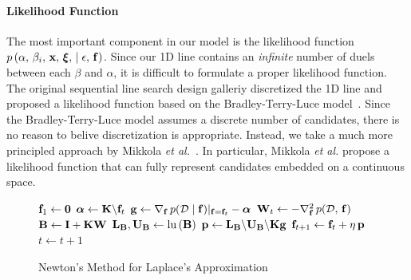 \paragraph{Likelihood Function}
The most important component in our model is the likelihood function \(p\,(\alpha,\, \beta_i,\, \mathbf{x},\,\bm{\xi},\, \mid \epsilon,\, \mathbf{f})\).
Since our 1D line contains an \textit{infinite} number of duels between each \(\beta\) and \(\alpha\), it is difficult to formulate a proper likelihood function.
The original sequential line search design galleriy discretized the 1D line and proposed a likelihood function based on the Bradley-Terry-Luce model~\cite{10.1145/3072959.3073598}.
Since the Bradley-Terry-Luce model assumes a discrete number of candidates, there is no reason to belive discretization is appropriate.
Instead, we take a much more principled approach by Mikkola \textit{et al.}~\cite{pmlr-v119-mikkola20a}.
In particular, Mikkola \textit{et al.} propose a likelihood function that can fully represent candidates embedded on a continuous space.

\begin{figure}[t]
  \removelatexerror
  \begin{algorithm2e}[H]
    \DontPrintSemicolon
    \SetAlgoLined
    \( \mathbf{f}_1 \leftarrow \mathbf{0} \)\;
     {
      \(\bm{\alpha}        \leftarrow \mathbf{K}\backslash\mathbf{f}_{t} \)\;
      \(\mathbf{g}            \leftarrow \nabla_{\mathbf{f}}\, p(\mathcal{D}\mid\mathbf{f})|_{\mathbf{f} = \mathbf{f}_t} - \bm{\alpha} \)\;
      \(\mathbf{W}_t          \leftarrow -  \nabla^2_{\mathbf{f}}\, p(\mathcal{D},\, \mathbf{f}) \)\;
      \(\mathbf{B}           \leftarrow \mathbf{I} + \mathbf{K} \mathbf{W} \)\;
      \(\mathbf{L}_{\mathbf{B}}, \mathbf{U}_{\mathbf{B}} \leftarrow \mathrm{lu}\,(\mathbf{B}) \)\;
      \(\mathbf{p}           \leftarrow \mathbf{L}_{\mathbf{B}} \backslash \mathbf{U}_{\mathbf{B}} \backslash \mathbf{K} \mathbf{g} \)\;
      \(\mathbf{f}_{t+1}      \leftarrow \mathbf{f}_t + \eta \, \mathbf{p} \)\;
      \(t \leftarrow t + 1\)\;
    }
    \caption{Newton's Method for Laplace's Approximation}\label{alg:newton}
  \end{algorithm2e}
\end{figure}
%
